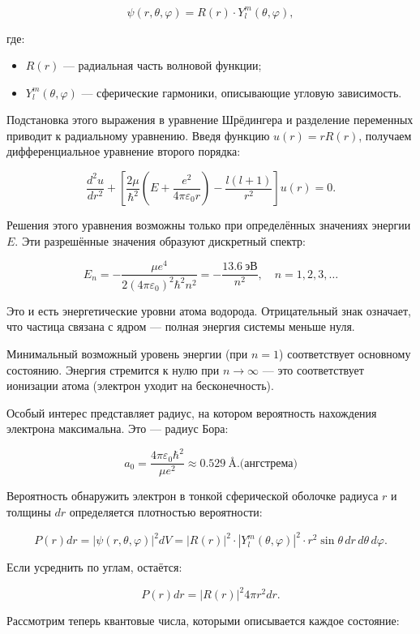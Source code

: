 $$
\psi(r, \theta, \varphi) = R(r) \cdot Y_l^m(\theta, \varphi),
$$

где:

\begin{itemize}
    \item $R(r)$ — радиальная часть волновой функции;
    \item $Y_l^m(\theta, \varphi)$ — сферические гармоники, описывающие угловую зависимость.
\end{itemize}

Подстановка этого выражения в уравнение Шрёдингера и разделение переменных приводит к радиальному уравнению. Введя функцию $u(r) = r R(r)$, получаем дифференциальное уравнение второго порядка:

$$
\frac{d^2 u}{dr^2} + \left[ \frac{2\mu}{\hbar^2} \left( E + \frac{e^2}{4\pi \varepsilon_0 r} \right) - \frac{l(l+1)}{r^2} \right] u(r) = 0.
$$

Решения этого уравнения возможны только при определённых значениях энергии $E$. Эти разрешённые значения образуют дискретный спектр:

$$
E_n = -\frac{\mu e^4}{2 (4\pi \varepsilon_0)^2 \hbar^2 n^2} = -\frac{13.6~\text{эВ}}{n^2}, \quad n = 1, 2, 3, \dots
$$

Это и есть энергетические уровни атома водорода. Отрицательный знак означает, что частица связана с ядром — полная энергия системы меньше нуля.

Минимальный возможный уровень энергии (при $n = 1$) соответствует основному состоянию. Энергия стремится к нулю при $n \to \infty$ — это соответствует ионизации атома (электрон уходит на бесконечность).

Особый интерес представляет радиус, на котором вероятность нахождения электрона максимальна. Это — радиус Бора:

$$
a_0 = \frac{4 \pi \varepsilon_0 \hbar^2}{\mu e^2} \approx 0.529~\text{\AA}. \text{(ангстрема)}
$$

Вероятность обнаружить электрон в тонкой сферической оболочке радиуса $r$ и толщины $dr$ определяется плотностью вероятности:

$$
P(r)dr = |\psi(r,\theta,\varphi)|^2 dV = |R(r)|^2 \cdot |Y_l^m(\theta, \varphi)|^2 \cdot r^2 \sin \theta \, dr \, d\theta \, d\varphi.
$$

Если усреднить по углам, остаётся:

$$
P(r) dr = |R(r)|^2 4\pi r^2 dr.
$$

Рассмотрим теперь квантовые числа, которыми описывается каждое состояние:

